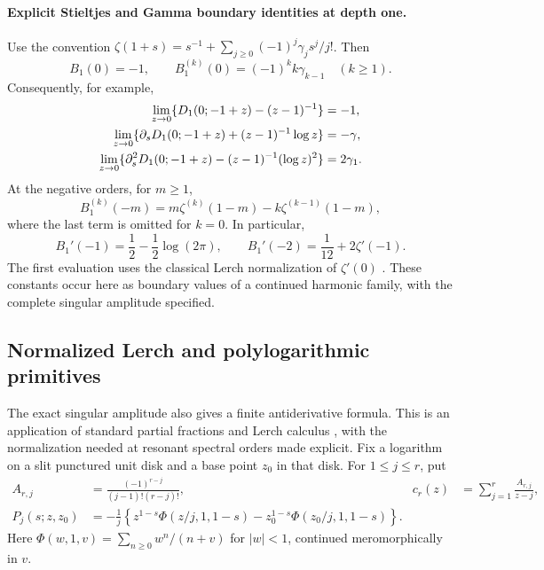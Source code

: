 \paragraph{Explicit Stieltjes and Gamma boundary identities at depth one.}
Use the convention
$\zeta(1+s)=s^{-1}+\sum_{j\geq0}(-1)^j\gamma_js^j/j!$.
Then \cite{DLMFHurwitz}
\begin{equation}\label{hsh:Stieltjes}
 B_1(0)=-1,\qquad
 B_1^{(k)}(0)=(-1)^k k\gamma_{k-1}\quad(k\geq1).
\end{equation}
Consequently, for example,
\begin{align}
 \lim_{z\to0}\{D_1(0;-1+z)-(z-1)^{-1}\}&=-1,\notag\\
 \lim_{z\to0}\{\partial_sD_1(0;-1+z)
                          +(z-1)^{-1}\log z\}&=-\gamma,\notag\\
 \lim_{z\to0}\{\partial_s^2D_1(0;-1+z)
                          -(z-1)^{-1}(\log z)^2\}&=2\gamma_1.
                                                       \label{hsh:stieltjeslimits}
\end{align}
At the negative orders, for $m\geq1$,
\begin{equation}\label{hsh:zetaexplicit}
 B_1^{(k)}(-m)=m\zeta^{(k)}(1-m)
                         -k\zeta^{(k-1)}(1-m),
\end{equation}
where the last term is omitted for $k=0$.  In particular,
\[
 B_1'(-1)=\frac12-\frac12\log(2\pi),\qquad
 B_1'(-2)=\frac1{12}+2\zeta'(-1).
\]
The first evaluation uses the classical Lerch normalization of
$\zeta'(0)$ \cite{DLMFHurwitz}.  These constants occur here as
boundary values of a continued harmonic family, with the complete
singular amplitude specified.

\subsection{Normalized Lerch and polylogarithmic primitives}
\label{hsh:primitives}

The exact singular amplitude also gives a finite antiderivative formula.
This is an application of standard partial fractions and Lerch calculus
\cite{DLMFLerch}, with the normalization needed at resonant spectral
orders made explicit.  Fix a logarithm on a slit punctured unit disk
and a base point $z_0$ in that disk.  For $1\leq j\leq r$, put
\begin{align}
 A_{r,j}&=\frac{(-1)^{r-j}}{(j-1)!(r-j)!},
 &c_r(z)&=\sum_{j=1}^{r}\frac{A_{r,j}}{z-j},
                                                    \label{hsh:primitivePF}\\
 P_j(s;z,z_0)&=-\frac1j\left\{
 z^{1-s}\Phi(z/j,1,1-s)
       -z_0^{1-s}\Phi(z_0/j,1,1-s)\right\}.
                                                    \label{hsh:Lerchprimitive}
\end{align}
Here $\Phi(w,1,v)=\sum_{n\geq0}w^n/(n+v)$ for $|w|<1$,
continued meromorphically in $v$.

